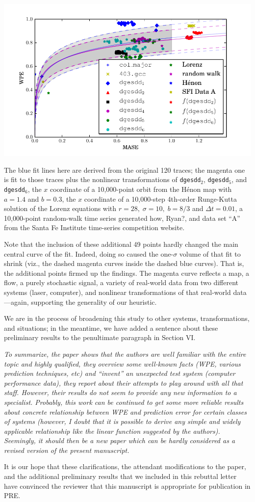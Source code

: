 \documentclass[12pt]{article}
\newcommand{\alert}[1]{{\color{red}#1}}
\begin{document}
\begin{center}
    \includegraphics[width=0.8\columnwidth]{figs/new_prediction_vs_entropy_extras_with_nonlinear_all_points}
\end{center}

The blue fit lines here are derived from the original 120 traces; the
magenta one is fit to those traces plus the nonlinear transformations
of {\tt dgesdd}$_2$, {\tt dgesdd}$_5$, and {\tt dgesdd}$_6$, the $x$
coordinate of a 10,000-point orbit from the H\'{e}non map with $a=1.4$
and $b=0.3$, the $x$ coordinate of a 10,000-step 4th-order Runge-Kutta
solution of the Lorenz equations with $r=28, \; \sigma=10, \; b=8/3$
and $\Delta t=0.01$, a 10,000-point random-walk time series generated
\alert{how, Ryan?}, and data set ``A'' from the Santa Fe Institute
time-series competition website.

Note that the inclusion of these additional 49 points hardly changed
the main central curve of the fit.  Indeed, doing so caused the
one-$\sigma$ volume of that fit to shrink (viz., the dashed magenta
curves inside the dashed blue curves).  That is, the additional points
firmed up the findings.  The magenta curve reflects a map, a flow, a
purely stochastic signal, a variety of real-world data from two
different systems (laser, computer), and nonlinear transformations of
that real-world data---again, supporting the generality of our
heuristic.

We are in the process of broadening this study to other systems,
transformations, and situations; in the meantime, we have added a
sentence about these preliminary results to the penultimate paragraph
in Section VI.

\smallskip

\emph{To summarize, the paper shows that the authors are well familiar
  with the entire topic and highly qualified, they overview some
  well-known facts (WPE, various prediction techniques, etc) and
  ``invent'' an unexpected test system (computer performance data),
  they report about their attempts to play around with all that
  staff. However, their results do not seem to provide any new
  information to a specialist. Probably, this work can be continued to
  get some more reliable results about concrete relationship between
  WPE and prediction error for certain classes of systems (however, I
  doubt that it is possible to derive any simple and widely applicable
  relationship like the linear function suggested by the
  authors). Seemingly, it should then be a new paper which can be
  hardly considered as a revised version of the present manuscript.}

It is our hope that these clarifications, the attendant modifications
to the paper, and the additional preliminary results that we included
in this rebuttal letter have convinced the reviewer that this
manuscript is appropriate for publication in PRE.
\end{document}
